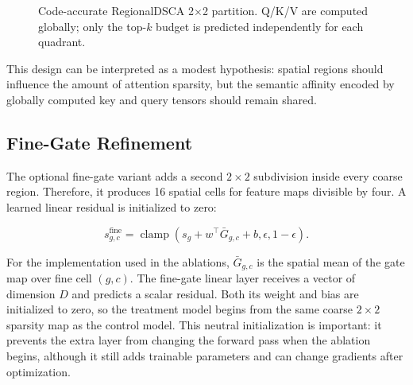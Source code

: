 \documentclass[10pt,twocolumn,letterpaper]{article}
\begin{document}
\begin{figure}[t]
\centering
{}
\caption{Code-accurate RegionalDSCA 2$\times$2 partition. Q/K/V are computed globally; only the top-$k$ budget is predicted independently for each quadrant.}
\label{fig:regional-dsca}
\end{figure}

This design can be interpreted as a modest hypothesis: spatial regions should influence the amount of attention sparsity, but the semantic affinity encoded by globally computed key and query tensors should remain shared.

\subsection{Fine-Gate Refinement}

The optional fine-gate variant adds a second $2\times2$ subdivision inside every coarse region. Therefore, it produces 16 spatial cells for feature maps divisible by four. A learned linear residual is initialized to zero:

\begin{equation}
    s_{g,c}^{\mathrm{fine}} = \operatorname{clamp}
    \left(s_g + w^{\top}\bar{G}_{g,c}+b,\epsilon,1-\epsilon\right).
\end{equation}

For the implementation used in the ablations, $\bar{G}_{g,c}$ is the spatial mean of the gate map over fine cell $(g,c)$. The fine-gate linear layer receives a vector of dimension $D$ and predicts a scalar residual. Both its weight and bias are initialized to zero, so the treatment model begins from the same coarse $2\times2$ sparsity map as the control model. This neutral initialization is important: it prevents the extra layer from changing the forward pass when the ablation begins, although it still adds trainable parameters and can change gradients after optimization.
\end{document}
